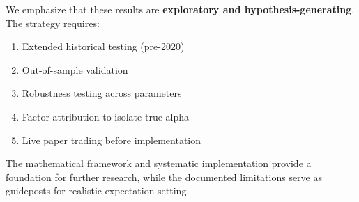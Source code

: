 \documentclass[12pt,a4paper]{article}
\theoremstyle{definition}
\begin{document}
We emphasize that these results are \textbf{exploratory and hypothesis-generating}. The strategy requires:

\begin{enumerate}
    \item Extended historical testing (pre-2020)
    \item Out-of-sample validation
    \item Robustness testing across parameters
    \item Factor attribution to isolate true alpha
    \item Live paper trading before implementation
\end{enumerate}

The mathematical framework and systematic implementation provide a foundation for further research, while the documented limitations serve as guideposts for realistic expectation setting.

\end{document}
